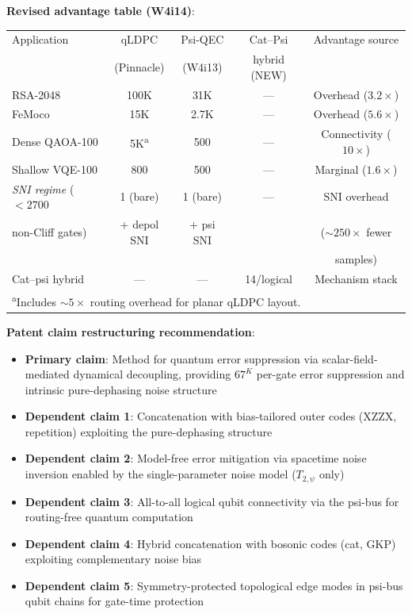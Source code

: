 \documentclass[11pt]{article}
\theoremstyle{definition}
\theoremstyle{remark}
\begin{document}
\begin{tcolorbox}[colback=blue!5!white, colframe=blue!60!black,
  title=\textbf{W4i14 TOP 5 FINDINGS --- READ FIRST}]
\begin{enumerate}[nosep]
  \textbf{Revised advantage table (W4i14)}:
  \begin{center}
  \begin{tabular}{@{}lcccc@{}}
  \toprule
  Application & qLDPC & Psi-QEC & Cat--Psi & Advantage source \\
  & (Pinnacle) & (W4i13) & hybrid (NEW) & \\
  \midrule
  RSA-2048 & 100K & 31K & --- & Overhead ($3.2\times$) \\
  FeMoco & 15K & 2.7K & --- & Overhead ($5.6\times$) \\
  Dense QAOA-100 & 5K\textsuperscript{a} & 500 & --- & Connectivity ($10\times$) \\
  Shallow VQE-100 & 800 & 500 & --- & Marginal ($1.6\times$) \\
  \emph{SNI regime} ($< 2700$ & 1 (bare) & 1 (bare) & --- & SNI overhead \\
  \quad non-Cliff gates) & + depol SNI & + psi SNI & & ($\sim 250\times$ fewer \\
  & & & & samples) \\
  Cat--psi hybrid & --- & --- & 14/logical & Mechanism stack \\
  \bottomrule
  \multicolumn{5}{l}{\textsuperscript{a}Includes $\sim 5\times$ routing
    overhead for planar qLDPC layout.}
  \end{tabular}
  \end{center}

  \textbf{Patent claim restructuring recommendation}:
  \begin{itemize}[nosep]
    \item \textbf{Primary claim}: Method for quantum error suppression via
      scalar-field-mediated dynamical decoupling, providing $67^K$
      per-gate error suppression and intrinsic pure-dephasing noise
      structure
    \item \textbf{Dependent claim 1}: Concatenation with bias-tailored
      outer codes (XZZX, repetition) exploiting the pure-dephasing
      structure
    \item \textbf{Dependent claim 2}: Model-free error mitigation via
      spacetime noise inversion enabled by the single-parameter noise
      model ($T_{2,\psi}$ only)
    \item \textbf{Dependent claim 3}: All-to-all logical qubit connectivity
      via the psi-bus for routing-free quantum computation
    \item \textbf{Dependent claim 4}: Hybrid concatenation with bosonic
      codes (cat, GKP) exploiting complementary noise bias
    \item \textbf{Dependent claim 5}: Symmetry-protected topological edge
      modes in psi-bus qubit chains for gate-time protection
  \end{itemize}


\end{enumerate}
\end{tcolorbox}
\end{document}

